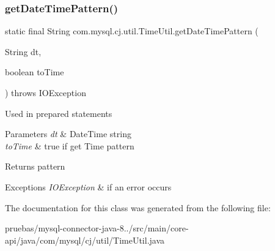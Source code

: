 \subsubsection{\texorpdfstring{get\+Date\+Time\+Pattern()}{getDateTimePattern()}}
{\footnotesize\ttfamily static final String com.\+mysql.\+cj.\+util.\+Time\+Util.\+get\+Date\+Time\+Pattern (\begin{DoxyParamCaption}\item[{String}]{dt,  }\item[{boolean}]{to\+Time }\end{DoxyParamCaption}) throws I\+O\+Exception\hspace{0.3cm}{\ttfamily [static]}}

Used in prepared statements


\begin{DoxyParams}{Parameters}
{\em dt} & Date\+Time string \\
\hline
{\em to\+Time} & true if get Time pattern \\
\hline
\end{DoxyParams}
\begin{DoxyReturn}{Returns}
pattern 
\end{DoxyReturn}

\begin{DoxyExceptions}{Exceptions}
{\em I\+O\+Exception} & if an error occurs \\
\hline
\end{DoxyExceptions}


The documentation for this class was generated from the following file\+:\begin{DoxyCompactItemize}
\item 
pruebas/mysql-\/connector-\/java-\/8../src/main/core-\/api/java/com/mysql/cj/util/Time\+Util.\+java\end{DoxyCompactItemize}
